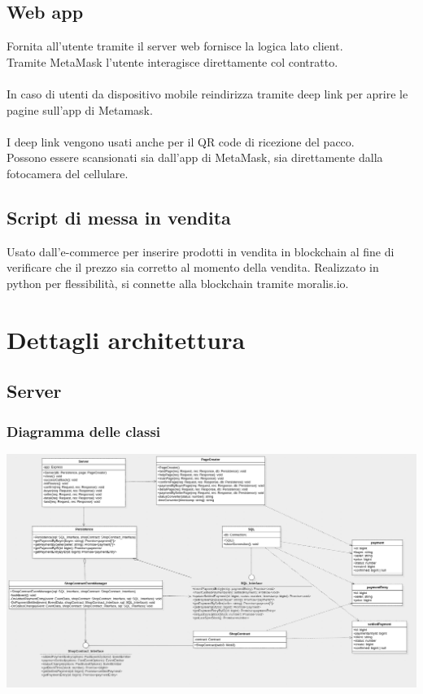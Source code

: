 \documentclass[a4paper, 12pt]{article}
\begin{document}
\subsection{Web app}
Fornita all'utente tramite il server web fornisce la logica lato client.\\
Tramite MetaMask l'utente interagisce direttamente col contratto.\\\\
In caso di utenti da dispositivo mobile reindirizza tramite deep link per aprire le pagine sull'app di Metamask.\\\\
I deep link vengono usati anche per il QR code di ricezione del pacco.\\
Possono essere scansionati sia dall'app di MetaMask, sia direttamente dalla fotocamera del cellulare.

\subsection{Script di messa in vendita}
Usato dall'e-commerce per inserire prodotti in vendita in blockchain al fine di verificare che il prezzo sia corretto al momento della vendita.
Realizzato in python per flessibilità, si connette alla blockchain tramite moralis.io.
\newpage
\section{Dettagli architettura}
\subsection{Server}
\subsubsection{Diagramma delle classi}
\includegraphics[width=1.0\textwidth]{server_class}
\end{document}
